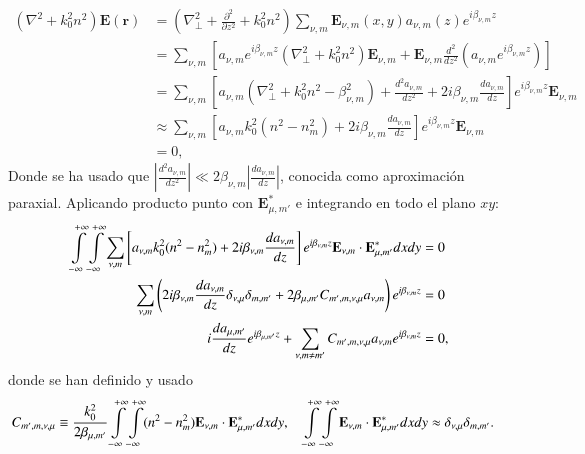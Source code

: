 \begin{align}
	(\nabla^2  + k_0^2n^2) \textbf{E}(\textbf{r}) &= \left(\nabla_\perp^2 + \frac{\partial^2}{\partial z^2} + k_0^2n^2 \right)\sum_{\nu, m} \textbf{E}_{\nu, m}(x, y) a_{\nu, m}(z) e^{i\beta_{\nu, m} z}
	\nonumber
	\\
	&= \sum_{\nu, m} \left[a_{\nu, m} e^{i\beta_{\nu, m} z} \left(\nabla_\perp^2 +k_0^2n^2 \right)\textbf{E}_{\nu, m} + \textbf{E}_{\nu, m}\frac{d^2}{d z^2}\left(a_{\nu, m} e^{i\beta_{\nu, m} z}\right)\right]
	\nonumber	
	\\
	&= \sum_{\nu, m} \left[a_{\nu, m}  \left(\nabla_\perp^2 +k_0^2n^2 -\beta_{\nu,m}^2 \right) + \frac{d^2 a_{\nu, m}}{d z^2}  +2i\beta_{\nu,m}\frac{d a_{\nu, m}}{d z} \right]e^{i\beta_{\nu, m} z}\textbf{E}_{\nu, m}
		\nonumber	
	\\
	&\approx \sum_{\nu, m} \left[a_{\nu, m}  k_0^2(n^2 - n^2_{m}) +2i\beta_{\nu,m}\frac{d a_{\nu, m}}{d z} \right]e^{i\beta_{\nu, m} z}\textbf{E}_{\nu, m}
	\nonumber	
	\\
	&= 0,
	\nonumber	
\end{align}
Donde se ha usado que $\left|\frac{d^2 a_{\nu, m}}{d z^2}\right|\ll 2\beta_{\nu,m}\left|\frac{d a_{\nu, m}}{d z}\right|  $, conocida como aproximación paraxial. Aplicando producto punto con $\textbf{E}_{\mu, m'}^*$ e integrando en todo el plano $xy$:
\begin{align}
	  \int\displaylimits_{-\infty}^{+\infty}\int\displaylimits_{-\infty}^{+\infty} \sum_{\nu, m} \left[a_{\nu, m}  k_0^2(n^2 - n^2_{m}) +2i\beta_{\nu,m}\frac{d a_{\nu, m}}{d z} \right]e^{i\beta_{\nu, m} z}\textbf{E}_{\nu, m} \cdot \textbf{E}_{\mu, m'}^* dxdy &= 0
	  \nonumber
	  \\
	  \sum_{\nu, m} \left(2i\beta_{\nu,m}\frac{d a_{\nu, m}}{d z} \delta_{\nu,\mu}\delta_{m,m'} +  2\beta_{\mu, m'}C_{m', m, \nu, \mu}   a_{\nu, m} \right)e^{i\beta_{\nu, m} z} &= 0
	  \nonumber
	  \\
	  	  i\frac{d a_{\mu, m'}}{d z} e^{i\beta_{\mu, m'} z} +  \sum_{\nu, m\neq m'}C_{m', m, \nu, \mu}   a_{\nu, m} e^{i\beta_{\nu, m} z} &= 0,
	  	  \nonumber
\end{align}
donde se han definido y usado
\begin{align*}
	   C_{m', m, \nu, \mu} &\equiv \frac{k_0^2}{2\beta_{\mu, m'}}\int\displaylimits_{-\infty}^{+\infty}\int\displaylimits_{-\infty}^{+\infty} (n^2 - n^2_{m}) \textbf{E}_{\nu, m} \cdot \textbf{E}_{\mu, m'}^* dxdy , \quad\int\displaylimits_{-\infty}^{+\infty}\int\displaylimits_{-\infty}^{+\infty} \textbf{E}_{\nu, m} \cdot \textbf{E}_{\mu, m'}^* dxdy \approx \delta_{\nu,\mu}\delta_{m,m'}.
\end{align*}

